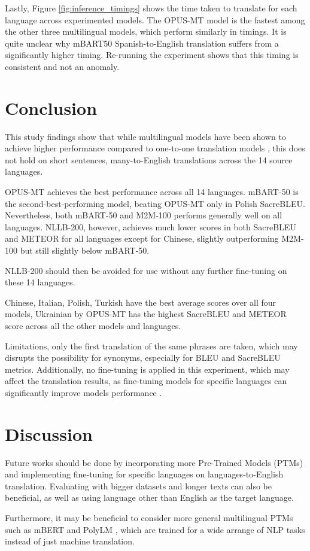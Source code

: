 \documentclass[a4paper]{article}
\begin{document}
Lastly, Figure \ref{fig:inference_timings} shows the time taken to translate for each language across experimented models. The OPUS-MT model is the fastest among the other three multilingual models, which perform similarly in timings. It is quite unclear why mBART50 Spanish-to-English translation suffers from a significantly higher timing. Re-running the experiment shows that this timing is consistent and not an anomaly.


\section{Conclusion}

This study findings show that while multilingual models have been shown to achieve higher performance compared to one-to-one translation models \cite{liu-2020-mbart}, this does not hold on short sentences, many-to-English translations across the 14 source languages.

OPUS-MT achieves the best performance across all 14 languages. mBART-50 is the second-best-performing model, beating OPUS-MT only in Polish SacreBLEU. Nevertheless, both mBART-50 and M2M-100 performs generally well on all languages. NLLB-200, however, achieves much lower scores in both SacreBLEU and METEOR for all languages except for Chinese, slightly outperforming M2M-100 but still slightly below mBART-50.

NLLB-200 should then be avoided for use without any further fine-tuning on these 14 languages.

Chinese, Italian, Polish, Turkish have the best average scores over all four models, Ukrainian by OPUS-MT has the highest SacreBLEU and METEOR score across all the other models and languages.

Limitations, only the first translation of the same phrases are taken, which may disrupts the possibility for synonyms, especially for BLEU and SacreBLEU metrics. Additionally, no fine-tuning is applied in this experiment, which may affect the translation results, as fine-tuning models for specific languages can significantly improve models performance \cite{zhang-2023-fine-tuning}.

\section{Discussion}

Future works should be done by incorporating more Pre-Trained Models (PTMs) and implementing fine-tuning for specific languages on languages-to-English translation. Evaluating with bigger datasets and longer texts can also be beneficial, as well as using language other than English as the target language.

Furthermore, it may be beneficial to consider more general multilingual PTMs such as mBERT \cite{wu-2020-mbert-are-all} and PolyLM \cite{wei-2023-polylm}, which are trained for a wide arrange of NLP tasks instead of just machine translation.

\printbibliography
\end{document}
